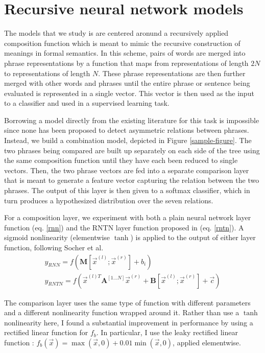 \section{Recursive neural network models}

The models that we study is are centered aronund a recursively applied composition function which is meant to mimic the recursive construction of meanings in formal semantics. In this scheme, pairs of words are merged into phrase representations by a function that maps from representations of length $2N$ to representations of length $N$. These phrase representations are then further merged with other words and phrases until the entire phrase or sentence being evaluated is represented in a single vector. This vector is then used as the input to a classifier and used in a supervised learning task.

Borrowing a model directly from the existing literature for this task is impossible since none has been proposed to detect asymmetric relations between phrases. Instead, we build a combination model, depicted in Figure \ref{sample-figure}. The two phrases being compared are built up separately on each side of the tree using the same composition function until they have each been reduced to single vectors. Then, the two phrase vectors are fed into a separate comparison layer that is meant to generate a feature vector capturing the relation between the two phrases. The output of this layer is then given to a softmax classifier, which in turn produces a hypothesized distribution over the seven relations.

For a composition layer, we experiment with both a plain neural network layer function (eq. \ref{rnn}) and the RNTN layer function proposed in \citet{chen2013learning} (eq. \ref{rntn}). A sigmoid nonlinearity (elementwise $\tanh$) is applied to the output of either layer function, following Socher et al.
\begin{gather} \label{rnn}
y_{RNN} = f(\mathbf{M} [\vec{x}^{(l)}; \vec{x}^{(r)}] + b_i)\\ %
\label{rntn}
y_{RNTN} = f(\vec{x}^{(l)T} \mathbf{A}^{[1...N]} \vec{x}^{(r)} + \mathbf{B} [\vec{x}^{(l)}; \vec{x}^{(r)}] + \vec{c})
\end{gather} %

The comparison layer uses the same type of function with different parameters and a different nonlinearity function wrapped around it. Rather than use a $\tanh$ nonlinearity here, I found a substantial improvement in performance by using a rectified linear function for $f_{b}$. In particular, I use the leaky rectified linear function \cite{maasrectifier}: $f_{b}(\vec{x})=\max(\vec{x}, 0) + 0.01\min(\vec{x}, 0)$,  applied elementwise. 


